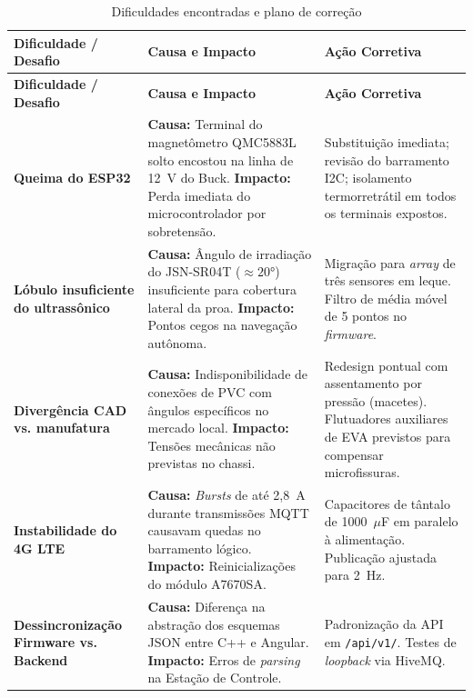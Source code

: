\documentclass[12pt,a4paper]{article}
\begin{document}
\footnotesize
\begin{longtable}{| p{} | p{} | p{} |}
\caption{Dificuldades encontradas e plano de correção} \label{tab:dificuldades} \\
\hline
\textbf{Dificuldade / Desafio} & \textbf{Causa e Impacto} & \textbf{Ação Corretiva} \\ \hline
\endfirsthead
\hline
\textbf{Dificuldade / Desafio} & \textbf{Causa e Impacto} & \textbf{Ação Corretiva} \\ \hline
\endhead

\textbf{Queima do ESP32} & \textbf{Causa:} Terminal do magnetômetro QMC5883L solto encostou na linha de 12~V do Buck. \newline \textbf{Impacto:} Perda imediata do microcontrolador por sobretensão. & Substituição imediata; revisão do barramento I2C; isolamento termorretrátil em todos os terminais expostos. \\ \hline

\textbf{Lóbulo insuficiente do ultrassônico} & \textbf{Causa:} Ângulo de irradiação do JSN-SR04T ($\approx 20°$) insuficiente para cobertura lateral da proa. \newline \textbf{Impacto:} Pontos cegos na navegação autônoma. & Migração para \textit{array} de três sensores em leque. Filtro de média móvel de 5 pontos no \textit{firmware}. \\ \hline

\textbf{Divergência CAD vs. manufatura} & \textbf{Causa:} Indisponibilidade de conexões de PVC com ângulos específicos no mercado local. \newline \textbf{Impacto:} Tensões mecânicas não previstas no chassi. & Redesign pontual com assentamento por pressão (macetes). Flutuadores auxiliares de EVA previstos para compensar microfissuras. \\ \hline

\textbf{Instabilidade do 4G LTE} & \textbf{Causa:} \textit{Bursts} de até 2{,}8~A durante transmissões MQTT causavam quedas no barramento lógico. \newline \textbf{Impacto:} Reinicializações do módulo A7670SA. & Capacitores de tântalo de 1000~$\mu$F em paralelo à alimentação. Publicação ajustada para 2~Hz. \\ \hline

\textbf{Dessincronização Firmware vs. Backend} & \textbf{Causa:} Diferença na abstração dos esquemas JSON entre C++ e Angular. \newline \textbf{Impacto:} Erros de \textit{parsing} na Estação de Controle. & Padronização da API em \texttt{/api/v1/}. Testes de \textit{loopback} via HiveMQ. \\ \hline

\end{longtable}
\normalsize
\end{document}
